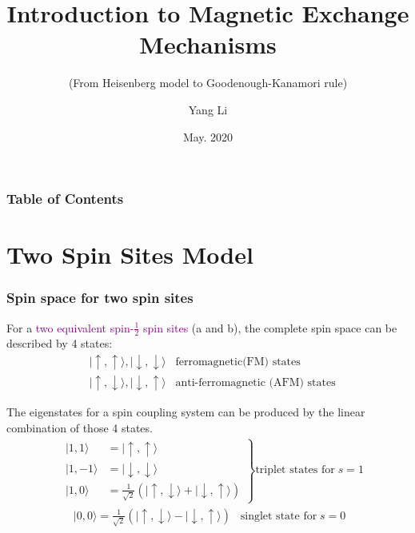 \documentclass{beamer}
\title[CMT.Tsinghua]{Introduction to Magnetic Exchange Mechanisms}
\subtitle{(From Heisenberg model to Goodenough-Kanamori rule)}
\author[Yang Li]
{Yang Li\inst{1}}
\institute[Physics@Tsinghua] 
{
  \inst{1}%
  Department of Physics\\
  Tsinghua University 
}
\date[Tsinghua Physics 2020]{May. 2020}
\begin{document}
  \frame{\titlepage}

  \begin{frame}
    \frametitle{Table of Contents}
    \tableofcontents
  \end{frame}

  \section{Two Spin Sites Model}

  \begin{frame}
    \frametitle{Spin space for two spin sites}
    For a \textcolor{purple}{two equivalent spin-\(\frac{1}{2}\) spin sites} (a and b), the complete spin space can be described by 4 states:
    \begin{equation*}
      \begin{aligned}
        &|\uparrow,\uparrow\rangle, |\downarrow,\downarrow\rangle \;\;\;\text{ferromagnetic(FM) states}\\
        &|\uparrow,\downarrow\rangle, |\downarrow, \uparrow\rangle \;\;\;\text{anti-ferromagnetic (AFM) states}
      \end{aligned}
    \end{equation*}

    The eigenstates for a spin coupling system can be produced by the linear combination of those 4 states.
    \begin{equation*}
      \begin{aligned}
        &\left.\begin{aligned}|1,1\rangle &= |\uparrow,\uparrow\rangle\\
        |1,-1\rangle &= |\downarrow,\downarrow\rangle\\
        |1,0\rangle &= \frac{1}{\sqrt{2}}\left(|\uparrow,\downarrow\rangle + |\downarrow, \uparrow\rangle\right) \end{aligned}\right\} \text{triplet states for}\; s = 1\\
        &\;\;\;\;|0,0\rangle = \frac{1}{\sqrt{2}}\left(|\uparrow,\downarrow\rangle - |\downarrow, \uparrow\rangle\right)\;\;\; \text{singlet state for}\; s = 0
      \end{aligned}
    \end{equation*}
  \end{frame}
\end{document}
